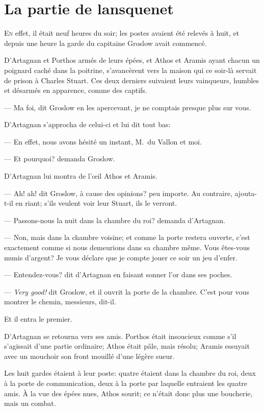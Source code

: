 \chapter{La partie de lansquenet}

\lettrine{E}{n} effet, il était neuf heures du soir; les postes avaient été relevés à huit, et depuis une heure la garde du capitaine Groslow avait commencé.

\zz
D'Artagnan et Porthos armés de leurs épées, et Athos et Aramis ayant chacun un poignard caché dans la poitrine, s'avancèrent vers la maison qui ce soir-là servait de prison à Charles Stuart. Ces deux derniers suivaient leurs vainqueurs, humbles et désarmés en apparence, comme des captifs.

— Ma foi, dit Groslow en les apercevant, je ne comptais presque plus sur vous.

D'Artagnan s'approcha de celui-ci et lui dit tout bas:

— En effet, nous avons hésité un instant, M.~du Vallon et moi.

— Et pourquoi? demanda Groslow.

D'Artagnan lui montra de l'œil Athos et Aramis.

— Ah! ah! dit Groslow, à cause des opinions? peu importe. Au contraire, ajouta-t-il en riant; s'ils veulent voir leur Stuart, ils le verront.

— Passons-nous la nuit dans la chambre du roi? demanda d'Artagnan.

— Non, mais dans la chambre voisine; et comme la porte restera ouverte, c'est exactement comme si nous demeurions dans sa chambre même. Vous êtes-vous munis d'argent? Je vous déclare que je compte jouer ce soir un jeu d'enfer.

— Entendez-vous? dit d'Artagnan en faisant sonner l'or dans ses poches.

— \textit{Very good!} dit Groslow, et il ouvrit la porte de la chambre. C'est pour vous montrer le chemin, messieurs, dit-il.

Et il entra le premier.

D'Artagnan se retourna vers ses amis. Porthos était insoucieux comme s'il s'agissait d'une partie ordinaire; Athos était pâle, mais résolu; Aramis essuyait avec un mouchoir son front mouillé d'une légère sueur.

Les huit gardes étaient à leur poste: quatre étaient dans la chambre du roi, deux à la porte de communication, deux à la porte par laquelle entraient les quatre amis. À la vue des épées nues, Athos sourit; ce n'était donc plus une boucherie, mais un combat.

